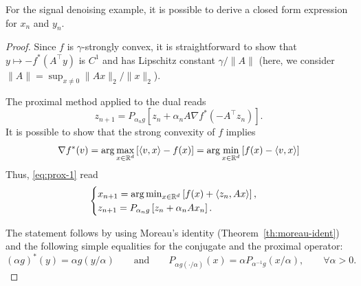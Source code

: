 \documentclass{report}
\begin{document}
\begin{remark}
	For the signal denoising example, it is possible to derive a closed form expression for $x_n$ and $y_n$.
\end{remark}

\begin{proof}
	Since $f$ is $\gamma$-strongly convex, it is straightforward to show that $y\mapsto -f^*(A^\top y)$ is $C^1$ and has Lipschitz constant $\gamma/\|A\|$ (here, we consider $\|A\|=\sup_{x\neq 0} \|Ax\|_2/\|x\|_2$).

	The proximal method applied to the dual reads 
	\begin{equation}
		\label{eq:prox-1}
		z_{n+1} = P_{\alpha_n g}\left[ z_n + \alpha_n A \nabla f^*(-A^\top z_n) \right].
	\end{equation}
	It is possible to show that the strong convexity of $f$ implies
	\begin{equation}
		\nabla f^* (v) = \arg\max_{x\in\mathbb{R}^d} \left[\langle v,x\rangle - f(x) \right] 
		= \arg\min_{x\in\mathbb{R}^d} \left[f(x)-\langle v,x\rangle \right] 
	\end{equation}
	Thus, \eqref{eq:prox-1} read 
	\begin{equation}
		\begin{cases}
			x_{n+1} =\arg\min_{x\in\mathbb{R}^d} \left[f(x)+\langle z_n,Ax\rangle \right] ,\\
			z_{n+1}=P_{\alpha_n g}\left[ z_n + \alpha_n A x_n \right].
		\end{cases}
	\end{equation}
	
	The statement follows by using Moreau's identity (Theorem~\ref{th:moreau-ident}) and the following simple equalities for the conjugate and the proximal operator:
	\begin{equation}
		(\alpha g)^*(y) = \alpha g(y / \alpha)
		\qquad\text{and}\qquad 
		P_{\alpha g(\cdot/\alpha)} (x) = \alpha P_{\alpha^{-1}g}(x/\alpha), 
		\qquad \forall\alpha>0.
	\end{equation}
\end{proof}



\printbibliography
\end{document}
